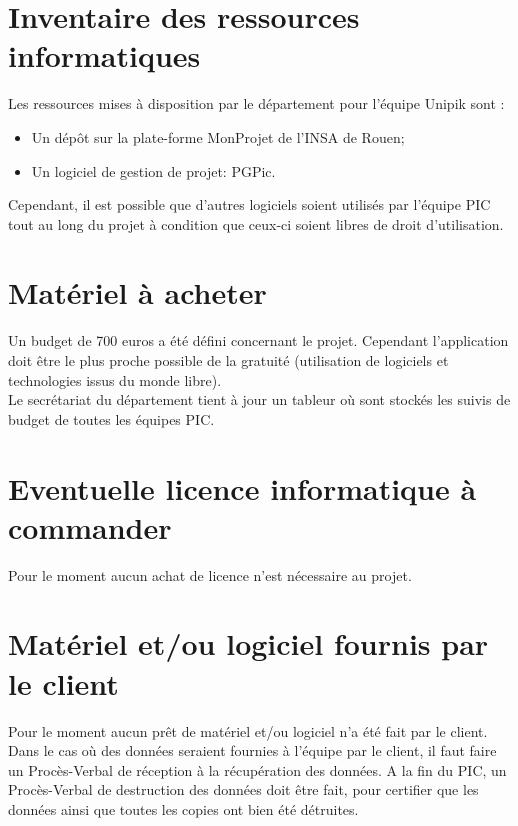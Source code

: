 \section{Inventaire des ressources informatiques}
\label{Inventaire des ressources informatiques}
Les ressources mises à disposition par le département \ASI{} pour l'équipe Unipik sont :

\begin{itemize}
	\item Un dépôt \git{} sur la plate-forme MonProjet de l'INSA de Rouen;
	\item Un logiciel de gestion de projet: PGPic.\\
\end{itemize}

Cependant, il est possible que d'autres logiciels soient utilisés par l'équipe PIC tout au long du projet à condition que ceux-ci soient libres de droit d'utilisation.

\section{Matériel à acheter}
\label{Matériel à acheter}
\indent Un budget de 700 euros a été défini concernant le projet. Cependant l'application doit être le plus proche possible de la gratuité (utilisation de logiciels et technologies issus du monde libre). \\
\indent Le secrétariat du département tient à jour un tableur où sont stockés les suivis de budget de toutes les équipes PIC.

\section{Eventuelle licence informatique à commander}
\label{Eventuelle licence informatique à commander}
\indent Pour le moment aucun achat de licence n'est nécessaire au projet.

\section{Matériel et/ou logiciel fournis par le client}
\label{Matériel et/ou logiciel fournis par le client}
\indent Pour le moment aucun prêt de matériel et/ou logiciel n'a été fait par le client.\\
\indent Dans le cas où des données seraient fournies à l’équipe \PICCourt par le client, il faut faire un Procès-Verbal de réception à la récupération des données. A la fin du PIC, un Procès-Verbal de destruction des données doit être fait, pour certifier que les données ainsi que toutes les copies ont bien été détruites.

